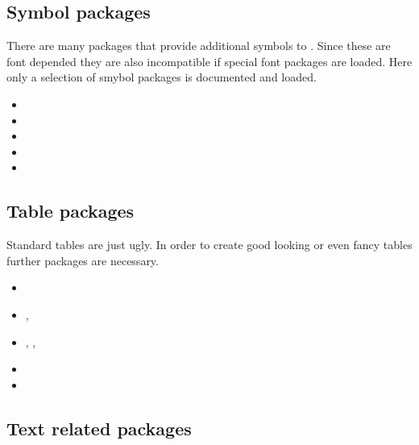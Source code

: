 
\subsection{Symbol packages}
There are many packages that provide additional symbols to \latex . Since these are font depended they are also incompatible if special font packages are loaded. Here only a selection of smybol packages is documented and loaded.

\begin{itemize}[noitemsep]
\item {}
\item {}
\item {}
\item {}
\item {}
\end{itemize}


\subsection{Table packages}
Standard \latex tables are just ugly. In order to create good looking or even fancy tables further packages are necessary.

\begin{itemize}[noitemsep]
\item {}
\item {}, 
\item {}, , 
\item {}
\item {}
\end{itemize}
 

\subsection{Text related packages}

